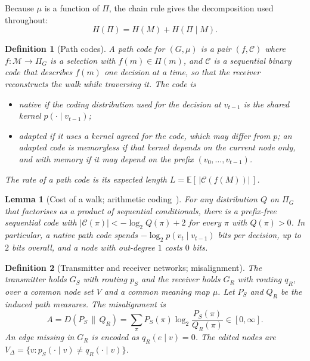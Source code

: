 \documentclass[11pt]{article}
\newtheorem{definition}{Definition}
\newtheorem{lemma}{Lemma}
\theoremstyle{remark}
\newcommand{\M}{\mathcal{M}}
\newcommand{\Pset}{\Pi}
\newcommand{\E}{\mathbb{E}}
\newcommand{\D}{D}
\begin{document}
Because $\mu$ is a function of $\Pi$, the chain rule gives the decomposition used throughout:
\begin{equation}\label{eq:chain}
H(\Pi)=H(M)+H(\Pi\mid M).
\end{equation}

\begin{definition}[Path codes]\label{def:codes}
A \emph{path code} for $(G,\mu)$ is a pair $(f,\mathcal{C})$ where $f:\M\to\Pset_G$ is a selection with $f(m)\in\Pset(m)$, and $\mathcal{C}$ is a sequential binary code that describes $f(m)$ one decision at a time, so that the receiver reconstructs the walk while traversing it. The code is
\begin{itemize}
\item \emph{native} if the coding distribution used for the decision at $v_{t-1}$ is the shared kernel $p(\cdot\mid v_{t-1})$;
\item \emph{adapted} if it uses a kernel agreed for the code, which may differ from $p$; an adapted code is \emph{memoryless} if that kernel depends on the current node only, and \emph{with memory} if it may depend on the prefix $(v_0,\dots,v_{t-1})$.
\end{itemize}
The rate of a path code is its expected length $L=\E[\,|\mathcal{C}(f(M))|\,]$.
\end{definition}

\begin{lemma}[Cost of a walk; arithmetic coding~\cite{rissanen1979,witten1987,cover2006}]\label{lem:cost}
For any distribution $Q$ on $\Pset_G$ that factorises as a product of sequential conditionals, there is a prefix-free sequential code with $|\mathcal{C}(\pi)|<-\log_2 Q(\pi)+2$ for every $\pi$ with $Q(\pi)>0$. In particular, a native path code spends $-\log_2 p(v_t\mid v_{t-1})$ bits per decision, up to $2$ bits overall, and a node with out-degree $1$ costs $0$ bits.
\end{lemma}

\begin{definition}[Transmitter and receiver networks; misalignment]\label{def:misalign}
The transmitter holds $G_S$ with routing $p_S$ and the receiver holds $G_R$ with routing $q_R$, over a common node set $V$ and a common meaning map $\mu$. Let $P_S$ and $Q_R$ be the induced path measures. The \emph{misalignment} is
\begin{equation}\label{eq:A}
A=\D(P_S\,\|\,Q_R)=\sum_{\pi}P_S(\pi)\log_2\frac{P_S(\pi)}{Q_R(\pi)}\in[0,\infty].
\end{equation}
An edge missing in $G_R$ is encoded as $q_R(e\mid v)=0$. The \emph{edited nodes} are $V_\Delta=\{v: p_S(\cdot\mid v)\neq q_R(\cdot\mid v)\}$.
\end{definition}
\end{document}

